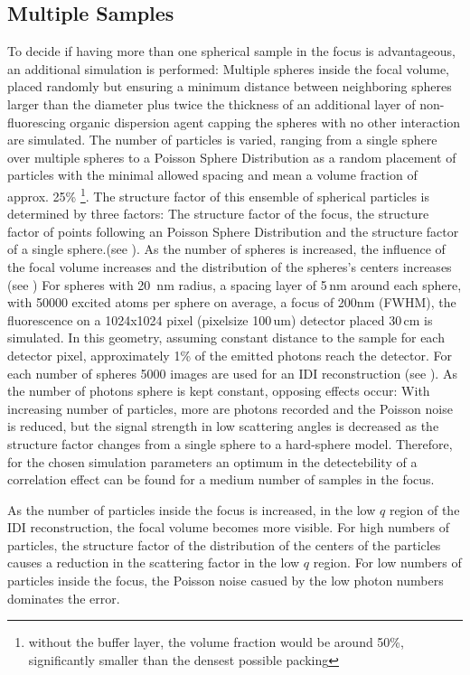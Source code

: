 \subsection{Multiple Samples}
To decide if having more than one spherical sample in the focus is advantageous, an additional simulation is performed:
Multiple spheres inside the focal volume, placed randomly but ensuring a minimum distance between neighboring spheres larger than the diameter plus twice the thickness of an additional layer of non-fluorescing organic dispersion agent capping the spheres with no other interaction are simulated.  The number of particles is varied, ranging from a single sphere over multiple spheres to a Poisson Sphere Distribution as a random placement of particles with the minimal allowed spacing and mean a volume fraction of approx. 25\% \footnote{without the buffer layer, the volume fraction would be around 50\%, significantly smaller than the densest possible packing}. 
The structure factor of this ensemble of spherical particles is determined by three factors: The structure factor of the focus, the structure factor of points following an Poisson Sphere Distribution and the structure factor of a single sphere.(see ). As the number of spheres is increased, the influence of the focal volume increases and the distribution of the spheres's centers increases (see  )
For spheres with 20\, nm radius, a spacing layer of 5\,nm around each sphere, with  50000 excited atoms per sphere on average, a focus of 200nm (FWHM), the fluorescence on a 1024x1024 pixel (pixelsize 100\,um) detector placed 30\,cm is simulated. In this geometry, assuming constant distance to the sample for each detector pixel, approximately 1\% of the emitted photons reach the detector. 
For each number of spheres 5000 images are used for an IDI reconstruction (see  ).
As the number of photons sphere is kept constant, opposing effects occur:  With increasing number of particles, more are photons recorded and the Poisson noise is reduced, but the signal strength in low scattering angles is decreased as the structure factor changes from a single sphere to a hard-sphere model. Therefore, for the chosen simulation parameters an optimum in the detectebility of a correlation effect can be found for a medium number of samples in the focus.


As the number of particles inside the focus is increased, in the low $q$ region of the IDI reconstruction, the focal volume becomes more visible. For high numbers of particles, the structure factor of the distribution of the centers of the particles causes a reduction in the scattering factor in the low $q$ region. For low numbers of particles inside the focus, the Poisson noise casued by the low photon numbers dominates the error.


